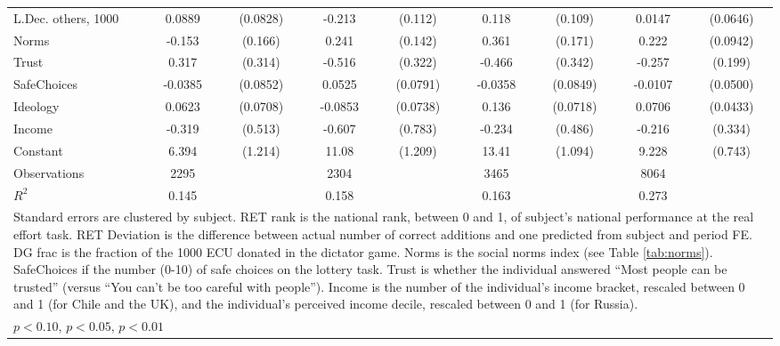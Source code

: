 {\begin{tabular}{l*{4}{cc}}
L.Dec. others, 1000&   0.0889         & (0.0828)&   -0.213\sym{*}  &  (0.112)&    0.118         &  (0.109)&   0.0147         & (0.0646)\\
Norms           &   -0.153         &  (0.166)&    0.241\sym{*}  &  (0.142)&    0.361\sym{**} &  (0.171)&    0.222\sym{**} & (0.0942)\\
Trust           &    0.317         &  (0.314)&   -0.516         &  (0.322)&   -0.466         &  (0.342)&   -0.257         &  (0.199)\\
SafeChoices     &  -0.0385         & (0.0852)&   0.0525         & (0.0791)&  -0.0358         & (0.0849)&  -0.0107         & (0.0500)\\
Ideology        &   0.0623         & (0.0708)&  -0.0853         & (0.0738)&    0.136\sym{*}  & (0.0718)&   0.0706         & (0.0433)\\
Income          &   -0.319         &  (0.513)&   -0.607         &  (0.783)&   -0.234         &  (0.486)&   -0.216         &  (0.334)\\
Constant        &    6.394\sym{***}&  (1.214)&    11.08\sym{***}&  (1.209)&    13.41\sym{***}&  (1.094)&    9.228\sym{***}&  (0.743)\\
\hline
Observations    &     2295         &         &     2304         &         &     3465         &         &     8064         &         \\
\(R^{2}\)       &    0.145         &         &    0.158         &         &    0.163         &         &    0.273         &         \\
\hline\hline
\multicolumn{9}{p{17cm}}{\tiny Standard errors are clustered by subject. RET rank is the national rank, between 0 and 1, of subject's national performance at the real effort task. RET Deviation is the difference between actual number of correct additions and one predicted from subject and period FE. DG frac is the fraction of the 1000 ECU donated in the dictator game. Norms is the social norms index (see Table \ref{tab:norms}). SafeChoices if the number (0-10) of safe choices on the lottery task. Trust is whether the individual answered ``Most people can be trusted'' (versus ``You can't be too careful with people''). Income is the number of the individual's income bracket, rescaled between 0 and 1 (for Chile and the UK), and the individual's perceived income decile, rescaled between 0 and 1 (for Russia).}\\
\multicolumn{9}{l}{\footnotesize \sym{*} \(p<0.10\), \sym{**} \(p<0.05\), \sym{***} \(p<0.01\)}\\
\end{tabular}
}
